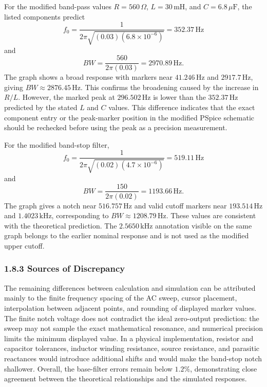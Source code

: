 \documentclass[12pt,a4paper]{article}
\begin{document}
For the modified band-pass values $R=560\,\Omega$, $L=30\,\mathrm{mH}$, and $C=6.8\,\mu\mathrm{F}$, the listed components predict
\begin{equation}
  f_0=\frac{1}{2\pi\sqrt{(0.03)(6.8\times10^{-6})}}
  =352.37\,\mathrm{Hz}
  \label{eq:modified-bp-f0}
\end{equation}
and
\begin{equation}
  BW=\frac{560}{2\pi(0.03)}=2970.89\,\mathrm{Hz}.
  \label{eq:modified-bp-bw}
\end{equation}
The graph shows a broad response with markers near $41.246\,\mathrm{Hz}$ and $2917.7\,\mathrm{Hz}$, giving $BW\approx2876.45\,\mathrm{Hz}$. This confirms the broadening caused by the increase in $R/L$. However, the marked peak at $296.502\,\mathrm{Hz}$ is lower than the $352.37\,\mathrm{Hz}$ predicted by the stated $L$ and $C$ values. This difference indicates that the exact component entry or the peak-marker position in the modified PSpice schematic should be rechecked before using the peak as a precision measurement.

For the modified band-stop filter,
\begin{equation}
  f_0=\frac{1}{2\pi\sqrt{(0.02)(4.7\times10^{-6})}}
  =519.11\,\mathrm{Hz}
  \label{eq:modified-bs-f0}
\end{equation}
and
\begin{equation}
  BW=\frac{150}{2\pi(0.02)}=1193.66\,\mathrm{Hz}.
  \label{eq:modified-bs-bw}
\end{equation}
The graph gives a notch near $516.757\,\mathrm{Hz}$ and valid cutoff markers near $193.514\,\mathrm{Hz}$ and $1.4023\,\mathrm{kHz}$, corresponding to $BW\approx1208.79\,\mathrm{Hz}$. These values are consistent with the theoretical prediction. The $2.5650\,\mathrm{kHz}$ annotation visible on the same graph belongs to the earlier nominal response and is not used as the modified upper cutoff.

\subsubsection*{1.8.3 Sources of Discrepancy}

The remaining differences between calculation and simulation can be attributed mainly to the finite frequency spacing of the AC sweep, cursor placement, interpolation between adjacent points, and rounding of displayed marker values. The finite notch voltage does not contradict the ideal zero-output prediction: the sweep may not sample the exact mathematical resonance, and numerical precision limits the minimum displayed value. In a physical implementation, resistor and capacitor tolerances, inductor winding resistance, source resistance, and parasitic reactances would introduce additional shifts and would make the band-stop notch shallower. Overall, the base-filter errors remain below $1.2\%$, demonstrating close agreement between the theoretical relationships and the simulated responses.
\end{document}
